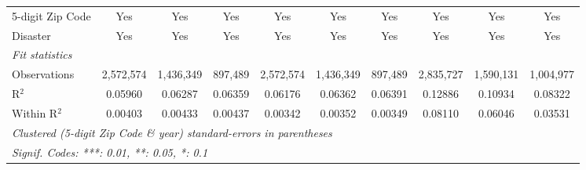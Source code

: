 \begin{tabular}{lccccccccc}
   5-digit Zip Code                                           & Yes            & Yes            & Yes            & Yes           & Yes            & Yes           & Yes          & Yes           & Yes\\  
   Disaster                                                   & Yes            & Yes            & Yes            & Yes           & Yes            & Yes           & Yes          & Yes           & Yes\\  
   \midrule
   \emph{Fit statistics}\\
   Observations                                               & 2,572,574      & 1,436,349      & 897,489        & 2,572,574     & 1,436,349      & 897,489       & 2,835,727    & 1,590,131     & 1,004,977\\  
   R$^2$                                                      & 0.05960        & 0.06287        & 0.06359        & 0.06176       & 0.06362        & 0.06391       & 0.12886      & 0.10934       & 0.08322\\  
   Within R$^2$                                               & 0.00403        & 0.00433        & 0.00437        & 0.00342       & 0.00352        & 0.00349       & 0.08110      & 0.06046       & 0.03531\\  
   \midrule \midrule
   \multicolumn{10}{l}{\emph{Clustered (5-digit Zip Code \& year) standard-errors in parentheses}}\\
   \multicolumn{10}{l}{\emph{Signif. Codes: ***: 0.01, **: 0.05, *: 0.1}}\\
\end{tabular}
\par\endgroup
